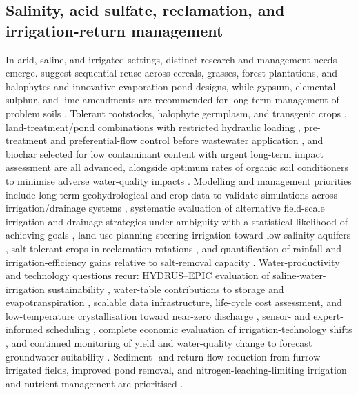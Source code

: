 \subsection{Salinity, acid sulfate, reclamation, and irrigation-return management}

In arid, saline, and irrigated settings, distinct research and management needs emerge. \textcite{Sharma2004} suggest sequential reuse across cereals, grasses, forest plantations, and halophytes and innovative evaporation-pond designs, while gypsum, elemental sulphur, and lime amendments are recommended for long-term management of problem soils \parencite{MANN1982,He2015}. Tolerant rootstocks, halophyte germplasm, and transgenic crops \parencite{Cuevas2019}, land-treatment/pond combinations with restricted hydraulic loading \parencite{Christen2010}, pre-treatment and preferential-flow control before wastewater application \parencite{Duan2015}, and biochar selected for low contaminant content with urgent long-term impact assessment \parencite{Tian2023b} are all advanced, alongside optimum rates of organic soil conditioners to minimise adverse water-quality impacts \parencite{Zhang2015}. Modelling and management priorities include long-term geohydrological and crop data to validate simulations across irrigation/drainage systems \parencite{Yao2017}, systematic evaluation of alternative field-scale irrigation and drainage strategies under ambiguity with a statistical likelihood of achieving goals \parencite{Alzraiee2013}, land-use planning steering irrigation toward low-salinity aquifers \parencite{Bethune2008}, salt-tolerant crops in reclamation rotations \parencite{Qadir2001}, and quantification of rainfall and irrigation-efficiency gains relative to salt-removal capacity \parencite{Castanheira2010}. Water-productivity and technology questions recur: HYDRUS--EPIC evaluation of saline-water-irrigation sustainability \parencite{Feng2019}, water-table contributions to storage and evapotranspiration \parencite{Jia2017}, scalable data infrastructure, life-cycle cost assessment, and low-temperature crystallisation toward near-zero discharge \parencite{Qin2025}, sensor- and expert-informed scheduling \parencite{Abdelkrim2021}, complete economic evaluation of irrigation-technology shifts \parencite{DINAR1989}, and continued monitoring of yield and water-quality change to forecast groundwater suitability \parencite{RADSTAKE1988,Karegoudar2022,Qian2025,ElHassanin2022,Ayars2006}. Sediment- and return-flow reduction from furrow-irrigated fields, improved pond removal, and nitrogen-leaching-limiting irrigation and nutrient management are prioritised \parencite{Bjorneberg2020}.

